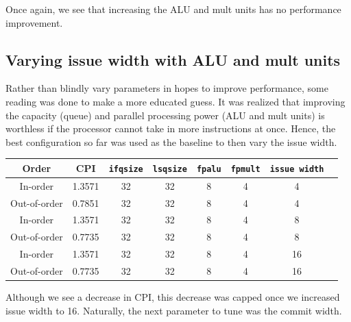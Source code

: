 \documentclass[twocolumn]{article}
\newcommand{\cc}[1]{\texttt{#1}}
\begin{document}
Once again, we see that increasing the ALU and mult units has no performance improvement.

\subsection{Varying issue width with ALU and mult units}

Rather than blindly vary parameters in hopes to improve performance, some reading was done to make a more educated guess. It was realized that improving the capacity (queue) and parallel processing power (ALU and mult units) is worthless if the processor cannot take in more instructions at once. Hence, the best configuration so far was used as the baseline to then vary the issue width. \\

\begingroup
    \medskip
    \centering
    \def\arraystretch{1.5}
        \begin{tabular}{cccccccc}
            \toprule
            Order & CPI & \cc{ifqsize} & \cc{lsqsize} & \cc{fpalu} & \cc{fpmult} & \cc{issue width}\\
            \midrule
            In-order & 1.3571 & 32 & 32 & 8 & 4 & 4\\
            Out-of-order & 0.7851 & 32 & 32 & 8 & 4 & 4\\
            \midrule
            In-order & 1.3571 & 32 & 32 & 8 & 4 & 8\\
            Out-of-order & 0.7735 & 32 & 32 & 8 & 4 & 8\\
            \midrule
            In-order & 1.3571 & 32 & 32 & 8 & 4 & 16\\
            Out-of-order & 0.7735 & 32 & 32 & 8 & 4 & 16\\
            \bottomrule
        \end{tabular}
    \label{table:btb}
    \medskip
\endgroup

Although we see a decrease in CPI, this decrease was capped once we increased issue width to 16. Naturally, the next parameter to tune was the commit width. \\
\end{document}
